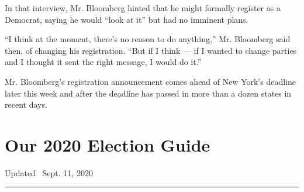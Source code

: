 In that interview, Mr. Bloomberg hinted that he might formally register
as a Democrat, saying he would ``look at it'' but had no imminent plans.

``I think at the moment, there's no reason to do anything,'' Mr.
Bloomberg said then, of changing his registration. ``But if I think ---
if I wanted to change parties and I thought it sent the right message, I
would do it.''

Mr. Bloomberg's registration announcement comes ahead of New York's
deadline later this week and after the deadline has passed in more than
a dozen states in recent days.

\hypertarget{our-2020-election-guide}{%
\section{Our 2020 Election Guide}\label{our-2020-election-guide}}

Updated ~Sept. 11, 2020

\begin{center}\rule{0.5\linewidth}{\linethickness}\end{center}

